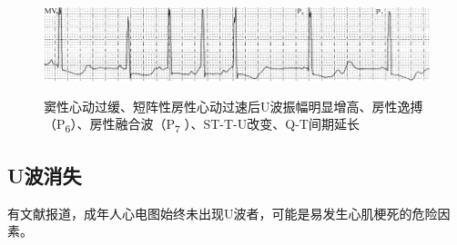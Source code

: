 \begin{figure}[!htbp]
 \centering
 \includegraphics[width=5.78125in,height=1.125in]{./images/Image00124.jpg}
 \captionsetup{justification=centering}
 \caption{窦性心动过缓、短阵性房性心动过速后U波振幅明显增高、房性逸搏（P\textsubscript{6}）、房性融合波（P\textsubscript{7} ）、ST-T-U改变、Q-T间期延长}
 \label{fig8-5}
  \end{figure} 


\protect\hypertarget{text00014.htmlux5cux23subid115}{}{}

\subsection{U波消失}

有文献报道，成年人心电图始终未出现U波者，可能是易发生心肌梗死的危险因素。

\protect\hypertarget{text00015.html}{}{}

\protect\hypertarget{text00015.htmlux5cux23chapter15}{}{}

